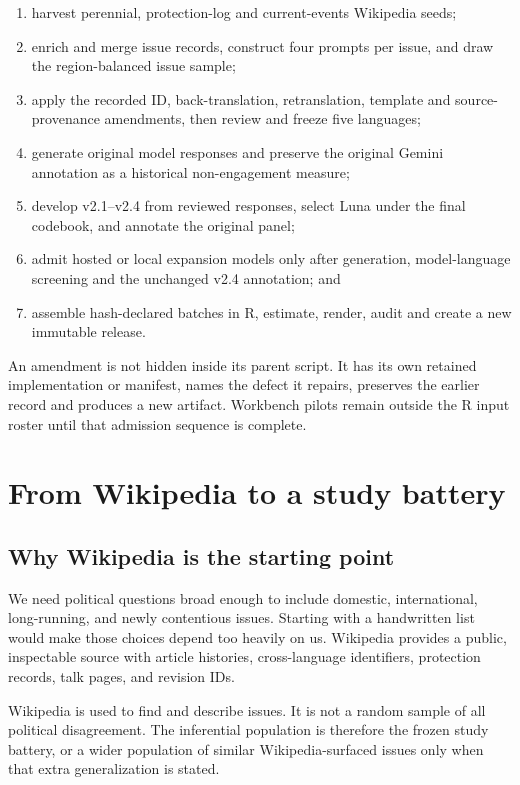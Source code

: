 \documentclass[11pt]{article}
\begin{document}
\begin{enumerate}[leftmargin=1.7em]
  \item harvest perennial, protection-log and current-events Wikipedia seeds;
  \item enrich and merge issue records, construct four prompts per issue, and
        draw the region-balanced issue sample;
  \item apply the recorded ID, back-translation, retranslation, template and
        source-provenance amendments, then review and freeze five languages;
  \item generate original model responses and preserve the original Gemini
        annotation as a historical non-engagement measure;
  \item develop v2.1--v2.4 from reviewed responses, select Luna under the final
        codebook, and annotate the original panel;
  \item admit hosted or local expansion models only after generation,
        model-language screening and the unchanged v2.4 annotation; and
  \item assemble hash-declared batches in R, estimate, render, audit and create
        a new immutable release.
\end{enumerate}

An amendment is not hidden inside its parent script. It has its own retained
implementation or manifest, names the defect it repairs, preserves the earlier
record and produces a new artifact. Workbench pilots remain outside the R input
roster until that admission sequence is complete.

\section{From Wikipedia to a study battery}

\subsection{Why Wikipedia is the starting point}

We need political questions broad enough to include domestic, international,
long-running, and newly contentious issues. Starting with a handwritten list
would make those choices depend too heavily on us. Wikipedia provides a public,
inspectable source with article histories, cross-language identifiers,
protection records, talk pages, and revision IDs.

Wikipedia is used to find and describe issues. It is not a random sample of all
political disagreement. The inferential population is therefore the frozen
study battery, or a wider population of similar Wikipedia-surfaced issues only
when that extra generalization is stated.
\end{document}
